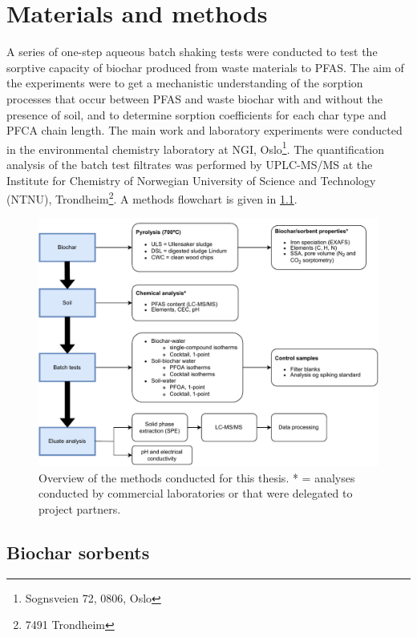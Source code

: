 \chapter{Materials and methods}\label{chap:MatlsMethds}
A series of one-step aqueous batch shaking tests were conducted to test the sorptive capacity of biochar produced from waste materials to PFAS. The aim of the experiments were to get a mechanistic understanding of the sorption processes that occur between PFAS and waste biochar with and without the presence of soil, and to determine sorption coefficients for each char type and PFCA chain length. The main work and laboratory experiments were conducted in the environmental chemistry laboratory at NGI, Oslo\footnote{Sognsveien 72, 0806, Oslo}. The quantification analysis of the batch test filtrates was performed by UPLC-MS/MS at the Institute for Chemistry of Norwegian University of Science and Technology (NTNU), Trondheim\footnote{7491 Trondheim}. A methods flowchart is given in \cref{fig:methodoverview}. 

\begin{figure}
    \centering
    \includegraphics[width=\textwidth]{Bilder/Flowcharts/Batch tests-General_overview_methods.pdf}
    \caption{Overview of the methods conducted for this thesis. * = analyses conducted by commercial laboratories or that were delegated to project partners.}
    \label{fig:methodoverview}
\end{figure}

\section{Biochar sorbents}

